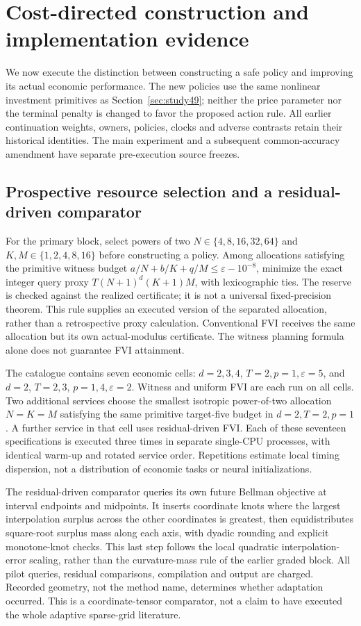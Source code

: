 \section{Cost-directed construction and implementation evidence}\label{sec:study50}
We now execute the distinction between constructing a safe policy and improving its actual economic performance. The new policies use the same nonlinear investment primitives as Section~\ref{sec:study49}; neither the price parameter nor the terminal penalty is changed to favor the proposed action rule. All earlier continuation weights, owners, policies, clocks and adverse contrasts retain their historical identities. The main experiment and a subsequent common-accuracy amendment have separate pre-execution source freezes.

\subsection{Prospective resource selection and a residual-driven comparator}
For the primary block, select powers of two $N\in\{4,8,16,32,64\}$ and $K,M\in\{1,2,4,8,16\}$ before constructing a policy. Among allocations satisfying the primitive witness budget $a/N+b/K+q/M\le\varepsilon-10^{-8}$, minimize the exact integer query proxy $T(N+1)^d(K+1)M$, with lexicographic ties. The reserve is checked against the realized certificate; it is not a universal fixed-precision theorem. This rule supplies an executed version of the separated allocation, rather than a retrospective proxy calculation. Conventional FVI receives the same allocation but its own actual-modulus certificate. The witness planning formula alone does not guarantee FVI attainment.

The catalogue contains seven economic cells: $d=2,3,4$, $T=2,p=1,\varepsilon=5$, and $d=2$, $T=2,3$, $p=1,4,\varepsilon=2$. Witness and uniform FVI are each run on all cells. Two additional services choose the smallest isotropic power-of-two allocation $N=K=M$ satisfying the same primitive target-five budget in $d=2,T=2,p=1$. A further service in that cell uses residual-driven FVI. Each of these seventeen specifications is executed three times in separate single-CPU processes, with identical warm-up and rotated service order. Repetitions estimate local timing dispersion, not a distribution of economic tasks or neural initializations.

The residual-driven comparator queries its own future Bellman objective at interval endpoints and midpoints. It inserts coordinate knots where the largest interpolation surplus across the other coordinates is greatest, then equidistributes square-root surplus mass along each axis, with dyadic rounding and explicit monotone-knot checks. This last step follows the local quadratic interpolation-error scaling, rather than the curvature-mass rule of the earlier graded block. All pilot queries, residual comparisons, compilation and output are charged. Recorded geometry, not the method name, determines whether adaptation occurred. This is a coordinate-tensor comparator, not a claim to have executed the whole adaptive sparse-grid literature.

